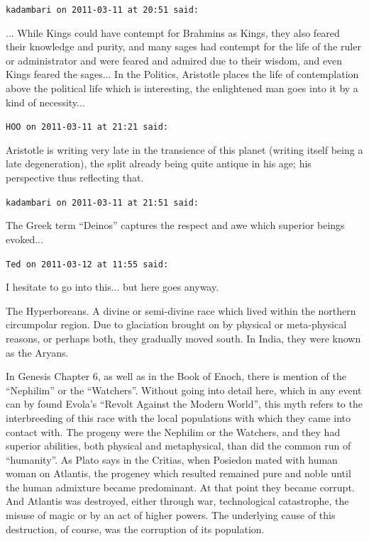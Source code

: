 \begin{footnotesize}
\begin{sffamily}
\hfill

\texttt{kadambari on 2011-03-11 at 20:51 said:}

... While Kings could have contempt for Brahmins as Kings, they also feared their knowledge and purity, and many sages had contempt for the life of the ruler or administrator and were feared and admired due to their wisdom, and even Kings feared the sages... In the Politics, Aristotle places the life of contemplation above the political life which is interesting, the enlightened man goes into it by a kind of necessity...

\texttt{HOO on 2011-03-11 at 21:21 said:}

Aristotle is writing very late in the transience of this planet (writing itself being a late degeneration), the split already being quite antique in his age; his perspective thus reflecting that.

\hfill

\texttt{kadambari on 2011-03-11 at 21:51 said:}

The Greek term ``Deinos'' captures the respect and awe which superior beings evoked... 

\hfill

\texttt{Ted on 2011-03-12 at 11:55 said:}

I hesitate to go into this... but here goes anyway.

The Hyperboreans. A divine or semi-divine race which lived within the northern circumpolar region. Due to glaciation brought on by physical or meta-physical reasons, or perhaps both, they gradually moved south. In India, they were known as the Aryans.

In Genesis Chapter 6, as well as in the Book of Enoch, there is mention of the ``Nephilim'' or the ``Watchers''. Without going into detail here, which in any event can by found Evola's ``Revolt Against the Modern World'', this myth refers to the interbreeding of this race with the local populations with which they came into contact with. The progeny were the Nephilim or the Watchers, and they had superior abilities, both physical and metaphysical, than did the common run of ``humanity''. As Plato says in the Critias, when Posiedon mated with human woman on Atlantis, the progeney which resulted remained pure and noble until the human admixture became predominant. At that point they became corrupt. And Atlantis was destroyed, either through war, technological catastrophe, the misuse of magic or by an act of higher powers. The underlying cause of this destruction, of course, was the corruption of its population.


\end{sffamily}
\end{footnotesize}
